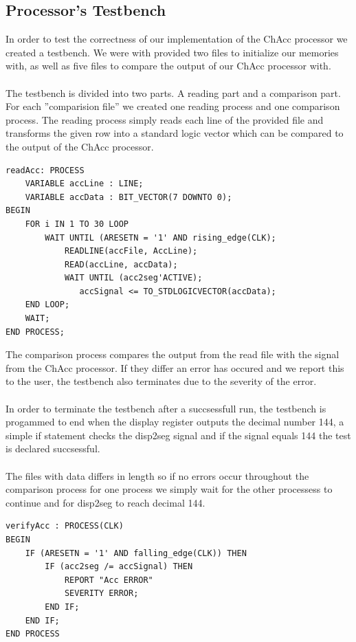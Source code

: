\documentclass[a4paper,11pt]{article}
\begin{document}
\subsection{Processor's Testbench}
In order to test the correctness of our implementation of the ChAcc processor 
we created a testbench. We were with provided two files to initialize our 
memories with, as well as five files to compare the output of our ChAcc 
processor with.\\\\
\noindent
The testbench is divided into two parts. A reading part and a comparison part. 
For each ''comparision file'' we created one reading 
process and one comparison process. The reading process simply reads each 
line of the provided file and transforms the given row into a standard 
logic vector which can be compared to the output of the ChAcc processor. 

\begin{lstlisting}[frame=single]
readAcc: PROCESS
    VARIABLE accLine : LINE;
    VARIABLE accData : BIT_VECTOR(7 DOWNTO 0);
BEGIN
    FOR i IN 1 TO 30 LOOP
        WAIT UNTIL (ARESETN = '1' AND rising_edge(CLK);
            READLINE(accFile, AccLine);
            READ(accLine, accData);
            WAIT UNTIL (acc2seg'ACTIVE);
               accSignal <= TO_STDLOGICVECTOR(accData);
    END LOOP;
    WAIT;
END PROCESS;
\end{lstlisting}

\noindent
The comparison process compares the output from the read file with the signal 
from the ChAcc processor. If they differ an error has occured and we report 
this to the user, the testbench also terminates due to the severity of the 
error.\\\\
\noindent
In order to terminate the testbench after a succsessfull run, the testbench 
is progammed to end when the display register outputs the decimal number 144, 
a simple if statement checks the disp2seg signal and if the signal equals 144 
the test is declared succsessful.\\\\
\noindent
The files with data differs in length so if no errors occur throughout 
the comparison process for one process we simply wait for the other 
processess to continue and for disp2seg to reach decimal 144.

\begin{lstlisting}[frame=single]
verifyAcc : PROCESS(CLK)
BEGIN
    IF (ARESETN = '1' AND falling_edge(CLK)) THEN
        IF (acc2seg /= accSignal) THEN
            REPORT "Acc ERROR"
            SEVERITY ERROR;
        END IF;
    END IF;
END PROCESS
\end{lstlisting}
\end{document}
